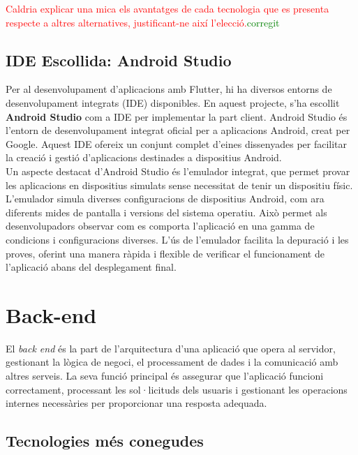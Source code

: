 \documentclass[a4paper,12pt,twoside]{ThesisStyle}
\newcommand{\pau}[1]{\textcolor{red}{#1}}
\newcommand{\sudan}[1]{\textcolor{green}{#1}}
\begin{document}
\pau{Caldria explicar una mica els avantatges de cada tecnologia que es presenta respecte a altres alternatives, justificant-ne així l'elecció.}\sudan{corregit}


\subsection{IDE Escollida: Android Studio}
\label{subsec:IDE Escollida: Android Studio}

Per al desenvolupament d'aplicacions amb Flutter, hi ha diversos entorns de desenvolupament integrats (IDE) disponibles. En aquest projecte, s'ha escollit \textbf{Android Studio} com a IDE per implementar la part client. Android Studio és l'entorn de desenvolupament integrat oficial per a aplicacions Android, creat per Google. Aquest IDE ofereix un conjunt complet d'eines dissenyades per facilitar la creació i gestió d'aplicacions destinades a dispositius Android.\\

Un aspecte destacat d'Android Studio és l'emulador integrat, que permet provar les aplicacions en dispositius simulats sense necessitat de tenir un dispositiu físic. L'emulador simula diverses configuracions de dispositius Android, com ara diferents mides de pantalla i versions del sistema operatiu. Això permet als desenvolupadors observar com es comporta l'aplicació en una gamma de condicions i configuracions diverses. L'ús de l'emulador facilita la depuració i les proves, oferint una manera ràpida i flexible de verificar el funcionament de l'aplicació abans del desplegament final.



\section{Back-end}
\label{sec: Back-end}

El \textit{back end} és la part de l'arquitectura d'una aplicació que opera al servidor, gestionant la lògica de negoci, el processament de dades i la comunicació amb altres serveis. La seva funció principal és assegurar que l'aplicació funcioni correctament, processant les sol·licituds dels usuaris i gestionant les operacions internes necessàries per proporcionar una resposta adequada.


\subsection{Tecnologies més conegudes}
\label{subsec: Tecnologies més conegudes}
\end{document}
